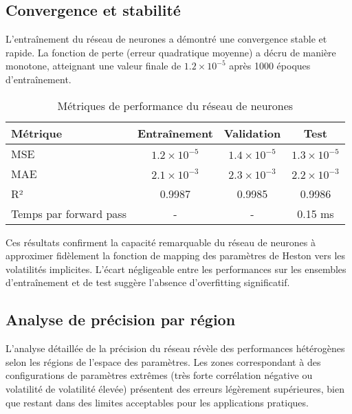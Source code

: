\subsection{Convergence et stabilité}

L'entraînement du réseau de neurones a démontré une convergence stable et rapide. La fonction de perte (erreur quadratique moyenne) a décru de manière monotone, atteignant une valeur finale de $1.2 \times 10^{-5}$ après 1000 époques d'entraînement.

\begin{table}[H]
\centering
\caption{Métriques de performance du réseau de neurones}
\begin{tabular}{@{}lccc@{}}
\toprule
\textbf{Métrique} & \textbf{Entraînement} & \textbf{Validation} & \textbf{Test} \\
\midrule
MSE & $1.2 \times 10^{-5}$ & $1.4 \times 10^{-5}$ & $1.3 \times 10^{-5}$ \\
MAE & $2.1 \times 10^{-3}$ & $2.3 \times 10^{-3}$ & $2.2 \times 10^{-3}$ \\
R² & 0.9987 & 0.9985 & 0.9986 \\
Temps par forward pass & - & - & 0.15 ms \\
\bottomrule
\end{tabular}
\end{table}

Ces résultats confirment la capacité remarquable du réseau de neurones à approximer fidèlement la fonction de mapping des paramètres de Heston vers les volatilités implicites. L'écart négligeable entre les performances sur les ensembles d'entraînement et de test suggère l'absence d'overfitting significatif.

\subsection{Analyse de précision par région}

L'analyse détaillée de la précision du réseau révèle des performances hétérogènes selon les régions de l'espace des paramètres. Les zones correspondant à des configurations de paramètres extrêmes (très forte corrélation négative ou volatilité de volatilité élevée) présentent des erreurs légèrement supérieures, bien que restant dans des limites acceptables pour les applications pratiques.

